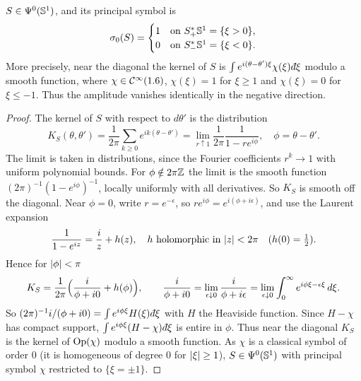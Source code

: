 \begin{theorem}\label{index:thm:szego}
  $S\in\Psi^{0}(\mathbb{S}^1)$, and its principal symbol is
  \begin{equation*}
    \sigma_0(S)=\begin{cases}1&\text{on }S^*_+\mathbb{S}^1=\{\xi>0\},\\
    0&\text{on }S^*_-\mathbb{S}^1=\{\xi<0\}.\end{cases}
  \end{equation*}
  More precisely, near the diagonal the kernel of $S$ is
  $\int e^{i(\theta-\theta')\xi}\chi(\xi)\,\dbar\xi$ modulo a smooth
  function, where $\chi\in\mathcal{C}^\infty(1.6)$, $\chi(\xi)=1$ for $\xi\ge1$ and
  $\chi(\xi)=0$ for $\xi\le-1$. Thus the amplitude vanishes identically in the
  negative direction.
\end{theorem}
\begin{proof}
  The kernel of $S$ with respect to $d\theta'$ is the distribution
  \begin{equation*}
    K_S(\theta,\theta')=\frac1{2\pi}\sum_{k\ge0}e^{ik(\theta-\theta')}
    =\lim_{r\uparrow1}\frac1{2\pi}\frac1{1-re^{i\phi}},\quad
    \phi=\theta-\theta'.
  \end{equation*}
  The limit is taken in distributions, since the Fourier coefficients
  $r^k\to1$ with uniform polynomial bounds. For $\phi\notin2\pi\mathbb{Z}$ the limit
  is the smooth function $(2\pi)^{-1}(1-e^{i\phi})^{-1}$, locally uniformly
  with all derivatives. So $K_S$ is smooth off the diagonal. Near $\phi=0$,
  write $r=e^{-\epsilon}$, so $re^{i\phi}=e^{i(\phi+i\epsilon)}$, and use the
  Laurent expansion
  \begin{equation*}
    \frac1{1-e^{iz}}=\frac iz+h(z),\quad h\text{ holomorphic in }\lvert z\rvert<2\pi
    \quad(h(0)=\tfrac12).
  \end{equation*}
  Hence for $\lvert \phi\rvert<\pi$
  \begin{equation*}
    K_S=\frac1{2\pi}\Bigl(\frac i{\phi+i0}+h(\phi)\Bigr),\qquad
    \frac{i}{\phi+i0}=\lim_{\epsilon\downarrow0}\frac i{\phi+i\epsilon}
    =\lim_{\epsilon\downarrow0}\int_0^\infty e^{i\phi\xi-\epsilon\xi}\,d\xi.
  \end{equation*}
  So $(2\pi)^{-1}i/(\phi+i0)=\int e^{i\phi\xi}H(\xi)\,\dbar\xi$ with $H$ the
  Heaviside function. Since $H-\chi$ has compact support,
  $\int e^{i\phi\xi}(H-\chi)\,\dbar\xi$ is entire in $\phi$. Thus near the
  diagonal $K_S$ is the kernel of $\operatorname{Op}(\chi)$ modulo a smooth function. As
  $\chi$ is a classical symbol of order $0$ (it is homogeneous of degree $0$
  for $\lvert \xi\rvert\ge1$), $S\in\Psi^{0}(\mathbb{S}^1)$ with principal symbol $\chi$
  restricted to $\{\xi=\pm1\}$.
\end{proof}

